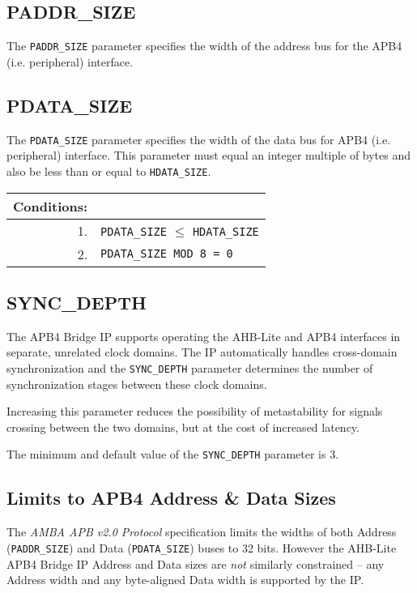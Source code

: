 \subsection{PADDR\_SIZE}\label{paddr_size}

The \texttt{PADDR\_SIZE} parameter specifies the width of the address bus for the
APB4 (i.e. peripheral) interface.

\subsection{PDATA\_SIZE}\label{pdata_size}

The \texttt{PDATA\_SIZE} parameter specifies the width of the data bus for APB4
(i.e. peripheral) interface. This parameter must equal an integer
multiple of bytes and also be less than or equal to \texttt{HDATA\_SIZE}.

\begin{longtable}[]{@{}|rp{12cm}@{}}
	\textbf{Conditions}: &  \\
	\endhead
	1. & \texttt{PDATA\_SIZE} $\leqslant$ \texttt{HDATA\_SIZE}\\
	2. & \texttt{PDATA\_SIZE MOD 8 = 0}\\
\end{longtable}	

\subsection{SYNC\_DEPTH}\label{sync_depth}

The APB4 Bridge IP supports operating the AHB-Lite and APB4 interfaces
in separate, unrelated clock domains. The IP automatically handles
cross-domain synchronization and the \texttt{SYNC\_DEPTH} parameter determines
the number of synchronization stages between these clock domains.

Increasing this parameter reduces the possibility of metastability for
signals crossing between the two domains, but at the cost of increased
latency.

The minimum and default value of the \texttt{SYNC\_DEPTH} parameter is 3.

\subsection{Limits to APB4 Address \& Data Sizes} \label{limits-to-apb4-address-data-sizes}

The \emph{AMBA APB v2.0 Protocol} specification limits the widths of
both Address (\texttt{PADDR\_SIZE}) and Data (\texttt{PDATA\_SIZE}) buses to 32 bits.
However the AHB-Lite APB4 Bridge IP Address and Data sizes are
\emph{not} similarly constrained -- any Address width and any
byte-aligned Data width is supported by the IP.